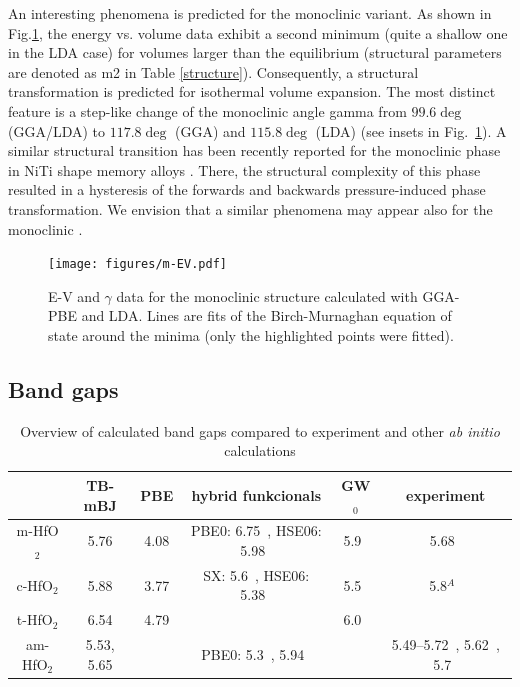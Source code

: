 \documentclass[10pt,a4paper,twocolumn]{article}
\begin{document}
An interesting phenomena is predicted for the monoclinic variant.
As shown in Fig.\ref{EV}, the energy vs. volume data exhibit a second minimum (quite a shallow one in the LDA case) for volumes larger than the equilibrium (structural parameters are denoted as m2 in Table \ref{structure}).
Consequently, a structural transformation is predicted for isothermal volume expansion.
The most distinct feature is a step-like change of the monoclinic angle gamma from $99.6\deg$ (GGA/LDA) to $117.8\deg$ (GGA) and $115.8\deg$ (LDA) (see insets in Fig.~\ref{EV}).
A similar structural transition has been recently reported for the monoclinic phase in NiTi shape memory alloys \cite{Holec2011-tg}.
There, the structural complexity of this phase resulted in a hysteresis of the forwards and backwards pressure-induced phase transformation.
We envision that a similar phenomena may appear also for the monoclinic .

\begin{figure}
\begin{center}
	\texttt{[image: figures/m-EV.pdf]}
	\caption{E-V and $\gamma$ data for the monoclinic structure calculated with GGA-PBE and LDA. Lines are fits of the Birch-Murnaghan equation of state around the minima (only the highlighted points were fitted).}
   \label{EV}
\end{center}
\end{figure}

\subsection{Band gaps}

\begin{table}
\begin{center}

\begin{tabular}{c|ccccc}
			& TB-mBJ & PBE & hybrid funkcionals & GW$_0$ & experiment \\
\hline
m-HfO$_2$ &	5.76 & 4.08 & PBE0: 6.75~\cite{Komsa2010}, HSE06: 5.98~\cite{Komsa2010} & 5.9~\cite{Gruning2010} & 5.68~\cite{Balog1977} \\
c-HfO$_2$ &	5.88 & 3.77 & SX: 5.6~\cite{Clark2010}, HSE06: 5.38~\cite{Yang2014} & 5.5~\cite{Gruning2010} & 5.8$^A$~\cite{Lim2002}\\
t-HfO$_2$ &	6.54 & 4.79 &  & 6.0~\cite{Gruning2010} & \\
am-HfO$_2$ & 5.53, 5.65 & & PBE0: 5.3~\cite{Broqvist2007}, 5.94~\cite{Chen2011} &  & 5.49--5.72~\cite{Takeuchi2004}, 5.62~\cite{Nguyen2005}, 5.7~\cite{Perevalov2007}\\

\end{tabular}
\caption{Overview of calculated band gaps compared to experiment and other \textit{ab initio} calculations}
\label{gaps}
\end{center}
\end{table}
\end{document}
